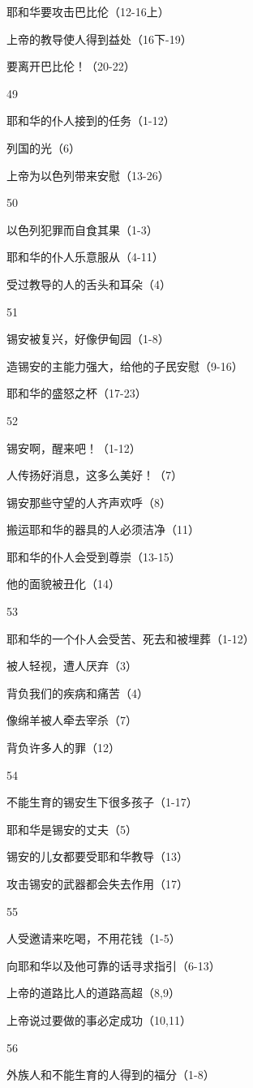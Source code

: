 耶和华要攻击巴比伦（12-16上）

上帝的教导使人得到益处（16下-19）

要离开巴比伦！（20-22）

49

耶和华的仆人接到的任务（1-12）

列国的光（6）

上帝为以色列带来安慰（13-26）

50

以色列犯罪而自食其果（1-3）

耶和华的仆人乐意服从（4-11）

受过教导的人的舌头和耳朵（4）

51

锡安被复兴，好像伊甸园（1-8）

造锡安的主能力强大，给他的子民安慰（9-16）

耶和华的盛怒之杯（17-23）

52

锡安啊，醒来吧！（1-12）

人传扬好消息，这多么美好！（7）

锡安那些守望的人齐声欢呼（8）

搬运耶和华的器具的人必须洁净（11）

耶和华的仆人会受到尊崇（13-15）

他的面貌被丑化（14）

53

耶和华的一个仆人会受苦、死去和被埋葬（1-12）

被人轻视，遭人厌弃（3）

背负我们的疾病和痛苦（4）

像绵羊被人牵去宰杀（7）

背负许多人的罪（12）

54

不能生育的锡安生下很多孩子（1-17）

耶和华是锡安的丈夫（5）

锡安的儿女都要受耶和华教导（13）

攻击锡安的武器都会失去作用（17）

55

人受邀请来吃喝，不用花钱（1-5）

向耶和华以及他可靠的话寻求指引（6-13）

上帝的道路比人的道路高超（8,9）

上帝说过要做的事必定成功（10,11）

56

外族人和不能生育的人得到的福分（1-8）

